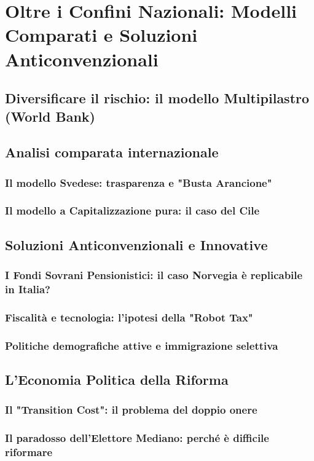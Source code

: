\chapter{Oltre i Confini Nazionali: Modelli Comparati e Soluzioni Anticonvenzionali}
\label{chap:modelli}

\section{Diversificare il rischio: il modello Multipilastro (World Bank)}

\section{Analisi comparata internazionale}
\subsection{Il modello Svedese: trasparenza e "Busta Arancione"}
\subsection{Il modello a Capitalizzazione pura: il caso del Cile}

\section{Soluzioni Anticonvenzionali e Innovative}
\subsection{I Fondi Sovrani Pensionistici: il caso Norvegia è replicabile in Italia?}
\subsection{Fiscalità e tecnologia: l'ipotesi della "Robot Tax"}
\subsection{Politiche demografiche attive e immigrazione selettiva}

\section{L'Economia Politica della Riforma}
\subsection{Il "Transition Cost": il problema del doppio onere}
\subsection{Il paradosso dell'Elettore Mediano: perché è difficile riformare}
